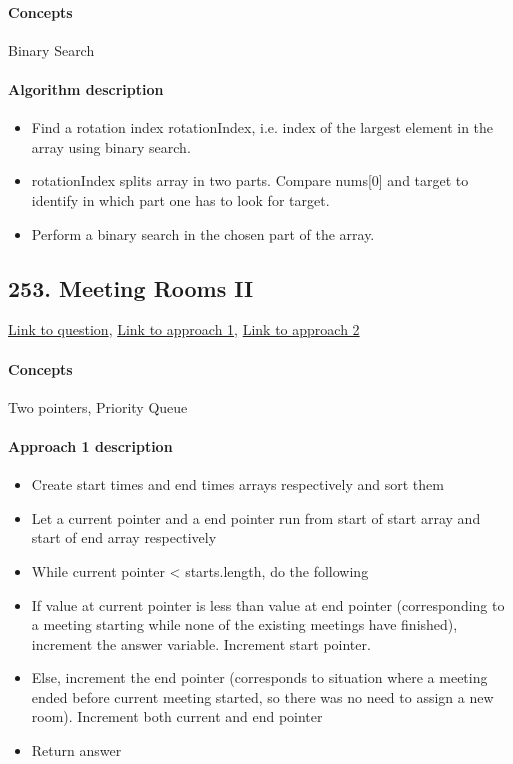 \documentclass[11pt]{book}
\begin{document}
\paragraph{Concepts}
Binary Search
\paragraph{Algorithm description}
\begin{itemize}
    \item Find a rotation index rotationIndex, i.e. index of the largest element in the array using binary search.
    \item rotationIndex splits array in two parts. Compare nums[0] and target to identify in which part one has to look for target.
    \item Perform a binary search in the chosen part of the array.
\end{itemize}

\subsection{253. Meeting Rooms II}
\href{https://leetcode.com/problems/meeting-rooms-ii/}{Link to question},
\href{https://leetcode.com/submissions/detail/340355885/}{Link to approach 1},
\href{https://leetcode.com/submissions/detail/340279708/}{Link to approach 2}
\paragraph{Concepts}
Two pointers, Priority Queue
\paragraph{Approach 1 description}
\begin{itemize}
    \item Create start times and end times arrays respectively and sort them
    \item Let a current pointer and a end pointer run from start of start array and start of end array respectively
    \item While current pointer < starts.length, do the following
    \item If value at current pointer is less than value at end pointer (corresponding to a meeting starting while none of the existing meetings have finished), increment the answer variable. Increment start pointer.
    \item Else, increment the end pointer (corresponds to situation where a meeting ended before current meeting started, so there was no need to assign a new room). Increment both current and end pointer
    \item Return answer
\end{itemize}
\end{document}
